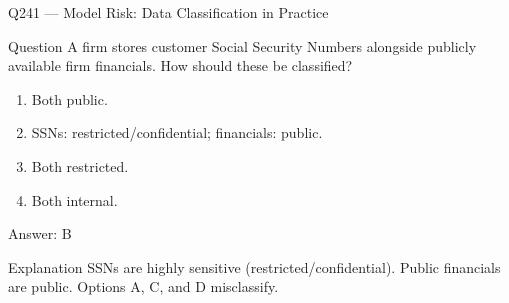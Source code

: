 \documentclass[aspectratio=169,8pt]{beamer}
\begin{document}
																																																\begin{frame}{Q241 --- Model Risk: Data Classification in Practice}
																																																	\begin{block}{Question}
																																																		A firm stores customer Social Security Numbers alongside publicly available firm financials. How should these be classified?
																																																		\begin{enumerate}
																																																			\item Both public.
																																																			\item SSNs: restricted/confidential; financials: public.
																																																			\item Both restricted.
																																																			\item Both internal.
																																																		\end{enumerate}  \end{block}
																																																		\begin{exampleblock}{Answer: B}\end{exampleblock}
																																																		\begin{block}{Explanation}
																																																			SSNs are highly sensitive (restricted/confidential). Public financials are public. Options A, C, and D misclassify.
																																																		\end{block}
																																																	\end{frame}
																																																	
\end{document}
